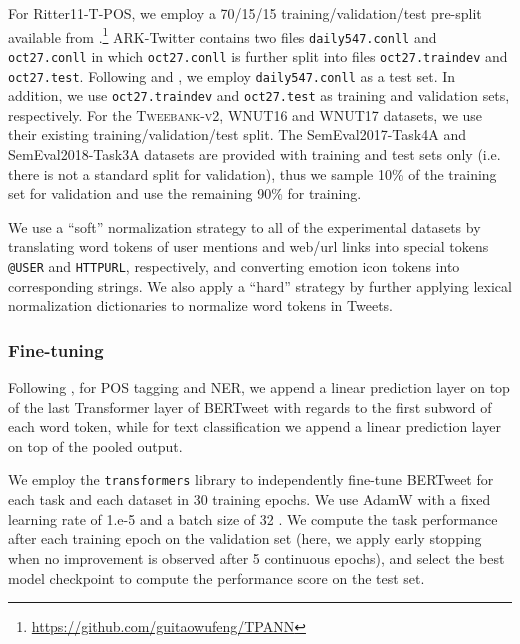 \documentclass[11pt,a4paper]{article}
\begin{document}
For Ritter11-T-POS, we employ a 70/15/15 training/validation/test pre-split available from .\footnote{\url{https://github.com/guitaowufeng/TPANN}}
ARK-Twitter contains two files \texttt{daily547.conll} and \texttt{oct27.conll} in which  \texttt{oct27.conll} is further split into files \texttt{oct27.traindev} and \texttt{oct27.test}. Following  and , we employ \texttt{daily547.conll} as a test set. In addition, we use \texttt{oct27.traindev} and \texttt{oct27.test} as training and validation sets, respectively. For the \textsc{Tweebank-v2}, WNUT16 and WNUT17 datasets, we use their existing training/validation/test split. The SemEval2017-Task4A and SemEval2018-Task3A datasets are provided with training and test sets only (i.e. there is not a standard split for validation), thus we sample 10\% of the training set for validation and use the remaining 90\% for training. 


We use a ``soft'' normalization strategy to all of the experimental datasets by translating word tokens of user mentions and web/url links into special tokens \texttt{@USER} and \texttt{HTTPURL}, respectively, and converting emotion icon tokens into corresponding strings. We also apply a ``hard''  strategy by further applying lexical normalization dictionaries  \cite{TYPO2010,liu-etal-2012-broad,han-etal-2012-automatically} to normalize word tokens in Tweets. 



\subsubsection*{Fine-tuning}

Following , for POS tagging and NER, we append a linear prediction layer on top of the last Transformer layer of BERTweet with regards to the first subword of each word token, while for text classification we append a linear prediction layer on top of the pooled output. 

We employ the \texttt{transformers} library \cite{Wolf2019HuggingFacesTS} to independently fine-tune BERTweet for each task and each dataset in 30 training epochs. We use AdamW   \citep{loshchilov2018decoupled} with a fixed learning rate of 1.e-5 and a batch size of 32 \citep{RoBERTa}. We compute the task performance after each training epoch on the validation set  (here, we apply early stopping when no improvement is observed after 5 continuous epochs), and select the best model checkpoint to compute the performance score on the test set. 
\end{document}
